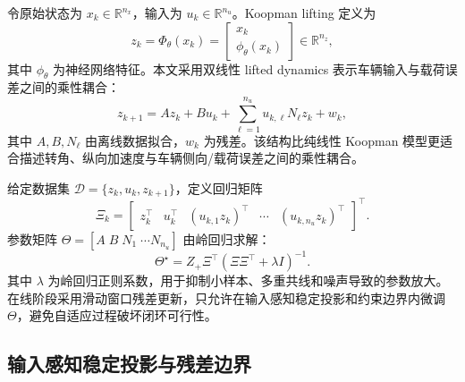 \documentclass[twocolumn,3p,times,procedia]{elsarticle}
\newcommand{\R}{\mathbb{R}}
\begin{document}
令原始状态为 $x_k\in\R^{n_x}$，输入为 $u_k\in\R^{n_u}$。Koopman lifting 定义为
\begin{equation}
z_k=\Phi_\theta(x_k)=\begin{bmatrix}x_k\\ \phi_\theta(x_k)\end{bmatrix}\in\R^{n_z},
\label{eq:koopman_lift}
\end{equation}
其中 $\phi_\theta$ 为神经网络特征。本文采用双线性 lifted dynamics 表示车辆输入与载荷误差之间的乘性耦合：
\begin{equation}
z_{k+1}=A z_k+B u_k+\sum_{\ell=1}^{n_u} u_{k,\ell} N_\ell z_k+w_k,
\label{eq:bilinear_koopman}
\end{equation}
其中 $A,B,N_\ell$ 由离线数据拟合，$w_k$ 为残差。该结构比纯线性 Koopman 模型更适合描述转角、纵向加速度与车辆侧向/载荷误差之间的乘性耦合。

给定数据集 $\mathcal D=\{z_k,u_k,z_{k+1}\}$，定义回归矩阵
\begin{equation}
\Xi_k=\begin{bmatrix}z_k^\top&u_k^\top&(u_{k,1}z_k)^\top&\cdots&(u_{k,n_u}z_k)^\top\end{bmatrix}^\top .
\label{eq:bilinear_regressor}
\end{equation}
参数矩阵 $\Theta=[A\;B\;N_1\;\cdots N_{n_u}]$ 由岭回归求解：
\begin{equation}
\Theta^\star=Z_+\Xi^\top(\Xi\Xi^\top+\lambda I)^{-1}.
\label{eq:ridge_fit}
\end{equation}
其中 $\lambda$ 为岭回归正则系数，用于抑制小样本、多重共线和噪声导致的参数放大。在线阶段采用滑动窗口残差更新，只允许在输入感知稳定投影和约束边界内微调 $\Theta$，避免自适应过程破坏闭环可行性。

\subsection{输入感知稳定投影与残差边界}
\end{document}
